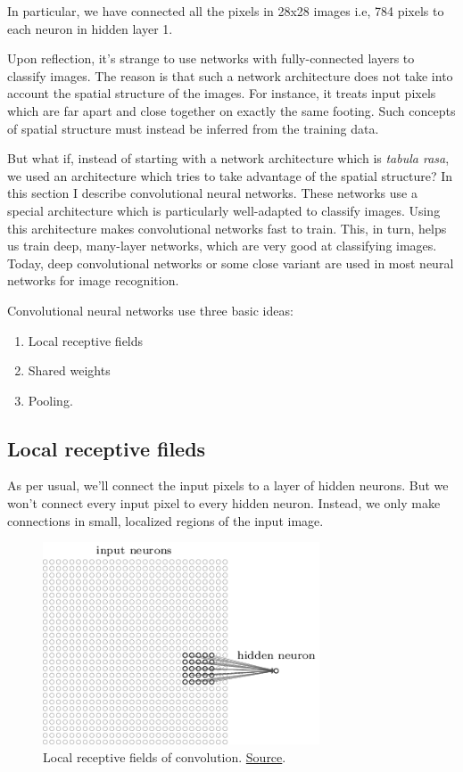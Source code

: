 \documentclass[a4paper]{tufte-handout}
\begin{document}
In particular, we have connected all the pixels in 28x28 images i.e, 784
pixels to each neuron in hidden layer 1.

Upon reflection, it's strange to use networks with fully-connected
layers to classify images. The reason is that such a network
architecture does not take into account the spatial structure of the
images. For instance, it treats input pixels which are far apart and
close together on exactly the same footing. Such concepts of spatial
structure must instead be inferred from the training data.

But what if, instead of starting with a network architecture which is
\emph{tabula rasa}, we used an architecture which tries to take
advantage of the spatial structure? In this section I describe
convolutional neural networks. These networks use a special architecture
which is particularly well-adapted to classify images. Using this
architecture makes convolutional networks fast to train. This, in turn,
helps us train deep, many-layer networks, which are very good at
classifying images. Today, deep convolutional networks or some close
variant are used in most neural networks for image recognition.

Convolutional neural networks use three basic ideas:

\begin{enumerate}
\item
  Local receptive fields
\item
  Shared weights
\item
  Pooling.
\end{enumerate}

\subsection{Local receptive fileds}

As per usual, we'll connect the input pixels to a layer of hidden
neurons. But we won't connect every input pixel to every hidden neuron.
Instead, we only make connections in small, localized regions of the
input image.

\begin{figure}
\includegraphics[height=60mm]{conv1}
\caption{Local receptive fields of convolution.
\href{http://neuralnetworksanddeeplearning.com/chap6.html\%22}{Source}.
}
\end{figure}
\end{document}
